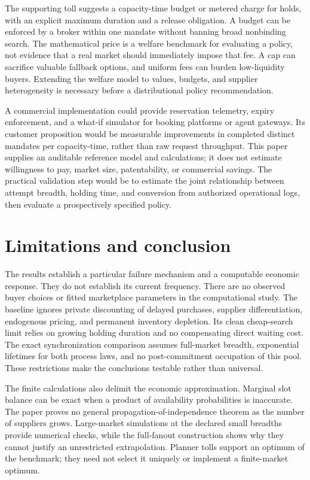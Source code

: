 \documentclass[11pt,a4paper]{article}
\begin{document}
The supporting toll suggests a capacity-time budget or metered charge for holds, with an explicit maximum duration and a release obligation. A budget can be enforced by a broker within one mandate without banning broad nonbinding search. The mathematical price is a welfare benchmark for evaluating a policy, not evidence that a real market should immediately impose that fee. A cap can sacrifice valuable fallback options, and uniform fees can burden low-liquidity buyers. Extending the welfare model to values, budgets, and supplier heterogeneity is necessary before a distributional policy recommendation.

A commercial implementation could provide reservation telemetry, expiry enforcement, and a what-if simulator for booking platforms or agent gateways. Its customer proposition would be measurable improvements in completed distinct mandates per capacity-time, rather than raw request throughput. This paper supplies an auditable reference model and calculations; it does not estimate willingness to pay, market size, patentability, or commercial savings. The practical validation step would be to estimate the joint relationship between attempt breadth, holding time, and conversion from authorized operational logs, then evaluate a prospectively specified policy.

\section{Limitations and conclusion}
The results establish a particular failure mechanism and a computable economic response. They do not establish its current frequency. There are no observed buyer choices or fitted marketplace parameters in the computational study. The baseline ignores private discounting of delayed purchases, supplier differentiation, endogenous pricing, and permanent inventory depletion. Its clean cheap-search limit relies on growing holding duration and no compensating direct waiting cost. The exact synchronization comparison assumes full-market breadth, exponential lifetimes for both process laws, and no post-commitment occupation of this pool. These restrictions make the conclusions testable rather than universal.

The finite calculations also delimit the economic approximation. Marginal slot balance can be exact when a product of availability probabilities is inaccurate. The paper proves no general propagation-of-independence theorem as the number of suppliers grows. Large-market simulations at the declared small breadths provide numerical checks, while the full-fanout construction shows why they cannot justify an unrestricted extrapolation. Planner tolls support an optimum of the benchmark; they need not select it uniquely or implement a finite-market optimum.
\end{document}
